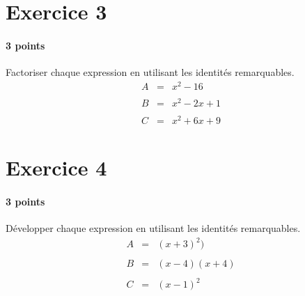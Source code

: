 \documentclass[a4paper]{article}
\begin{document}
  \section*{Exercice 3}
  \paragraph{3 points}
  Factoriser chaque expression en utilisant les identités remarquables.
  \[
    \begin{array}{rcl}
      A &=& x^2 - 16\\\\
      B &=& x^2 - 2x + 1\\\\
      C &=& x^2 + 6x + 9
    \end{array}
  \]

  \section*{Exercice 4}
  \paragraph{3 points}
  Développer chaque expression en utilisant les identités remarquables.
  \[
    \begin{array}{rcl}
      A &=& (x + 3)^2)\\\\
      B &=& (x - 4)(x + 4)\\\\
      C &=& (x - 1)^2
    \end{array}
  \]
\end{document}
